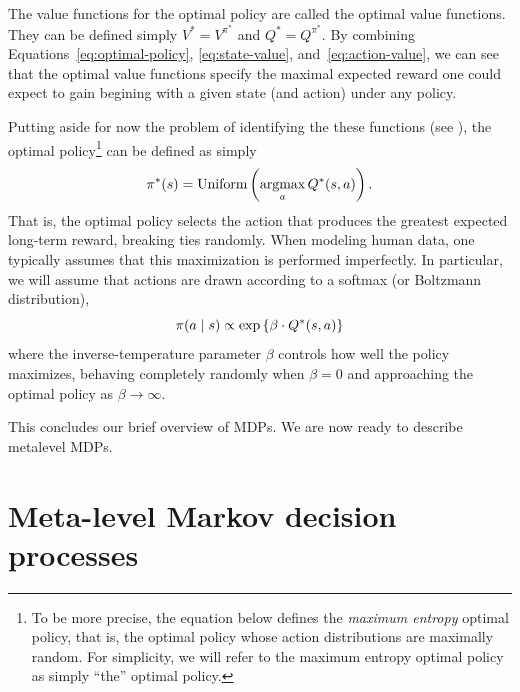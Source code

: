 The value functions for the optimal policy are called the optimal value functions. They can be defined simply $V^* = V^{\pi^*}$ and $Q^* = Q^{\pi^*}$. By combining Equations~\ref{eq:optimal-policy}, \ref{eq:state-value}, and~\ref{eq:action-value}, we can see that the optimal value functions specify the maximal expected reward one could expect to gain begining with a given state (and action) under any policy.

Putting aside for now the problem of identifying the these functions (see \citealp{puterman2014markov}), the optimal policy\footnote{%
  To be more precise, the equation below defines the \emph{maximum entropy} optimal policy, that is, the optimal policy whose action distributions are maximally random. For simplicity, we will refer to the maximum entropy optimal policy as simply ``the'' optimal policy.
} can be defined as simply
%
\begin{equation}\label{eq:argmaxQ}
  \pi^*(s) = \text{Uniform}\left(\operatorname*{argmax}_a Q^*(s, a)\right).
\end{equation}
%
That is, the optimal policy selects the action that produces the greatest expected long-term reward, breaking ties randomly. When modeling human data, one typically assumes that this maximization is performed imperfectly. In particular, we will assume that actions are drawn according to a softmax (or Boltzmann distribution),
%
\begin{equation}
  \pi(a \mid s) \propto \exp\left\{\beta \cdot Q^*(s, a)\right\}
\end{equation}
%
where the inverse-temperature parameter $\beta$ controls how well the policy maximizes, behaving completely randomly when $\beta = 0$ and approaching the optimal policy as $\beta \rightarrow \infty$.

This concludes our brief overview of MDPs. We are now ready to describe metalevel MDPs.


\section{Meta-level Markov decision processes}


